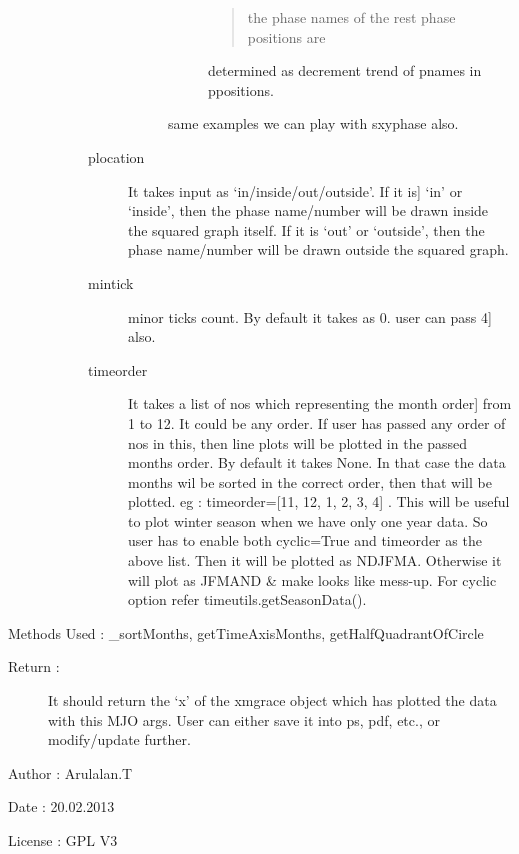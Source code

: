 \documentclass[letterpaper,10pt,english]{sphinxmanual}
\begin{document}
\begin{fulllineitems}
\begin{description}
\begin{description}
\begin{description}
\begin{description}
\begin{description}
\begin{quote}
the phase names of the rest phase positions are
\end{quote}

determined as decrement trend of pnames in ppositions.

\end{description}

same examples we can play with sxyphase also.

\end{description}

\item[{plocation}] \leavevmode{[}It takes input as `in/inside/out/outside'. If it is{]}
`in' or `inside', then the phase name/number will be drawn
inside the squared graph itself.
If it is `out' or `outside', then the phase name/number
will be drawn outside the squared graph.

\item[{mintick}] \leavevmode{[}minor ticks count. By default it takes as 0. user can pass 4{]}
also.

\item[{timeorder}] \leavevmode{[}It takes a list of nos which representing the month order{]}
from 1 to 12. It could be any order. If user has passed any
order of nos in this, then line plots will be plotted in
the passed months order. By default it takes None. In that
case the data months wil be sorted in the correct order,
then that will be plotted.
eg : timeorder={[}11, 12, 1, 2, 3, 4{]} . This will be useful
to plot winter season when we have only one year data.
So user has to enable both cyclic=True and timeorder as
the above list. Then it will be plotted as NDJFMA.
Otherwise it will plot as JFMAND \& make looks like mess-up.
For cyclic option refer timeutils.getSeasonData().

\end{description}

\end{description}

\end{description}

Methods Used : \_sortMonths, getTimeAxisMonths, getHalfQuadrantOfCircle
\begin{description}
\item[{Return :}] \leavevmode
It should return the `x' of the xmgrace object which has plotted the
data with this MJO args. User can either save it into ps, pdf, etc.,
or modify/update further.

\end{description}

Author : Arulalan.T

Date : 20.02.2013

License : GPL V3

\end{fulllineitems}
\end{document}
